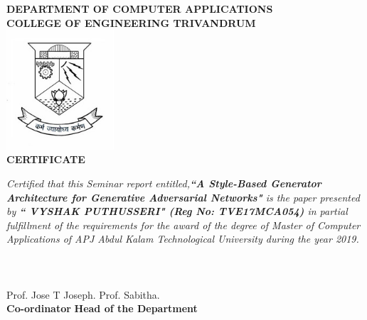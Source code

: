 
\begin{titlepage}
\begin{center}
\textbf{DEPARTMENT OF COMPUTER APPLICATIONS}\\[0.5cm]
\textbf{ COLLEGE OF ENGINEERING TRIVANDRUM}\\
[0.5cm]
\vspace{1.2cm}
\includegraphics[width=0.30\textwidth]{./cet}\\
\vspace{0.8cm}
\textbf{CERTIFICATE}\\
\end{center}
\emph{Certified that this Seminar report entitled,\textbf{``A Style-Based Generator Architecture for Generative Adversarial Networks"} is the paper presented by \textbf{`` VYSHAK PUTHUSSERI" (Reg No: TVE17MCA054)} in partial fulfillment of the requirements for the award of the degree of Master of Computer Applications of APJ Abdul Kalam Technological University during the year 2019.}\\\\\\\\
\vspace{0.5cm}
Prof. Jose T Joseph.
\hspace{9.5cm}
Prof. Sabitha.\\ 
\hspace{3.9cm} \textbf{Co-ordinator}
\hspace{9.2cm}
\textbf{Head of the Department}

\end{titlepage}
